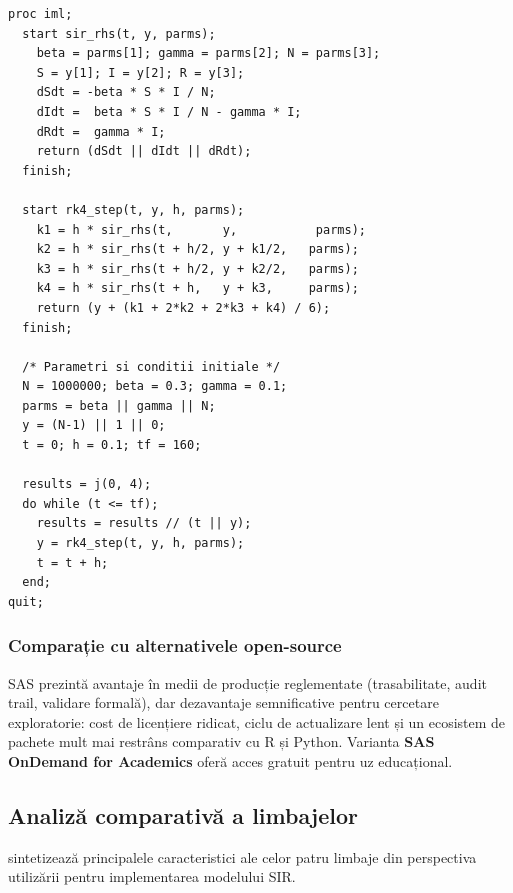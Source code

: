 \begin{lstlisting}[language=SAS, caption={Rezolvarea sistemului SIR în SAS/IML cu schema RK4}]
proc iml;
  start sir_rhs(t, y, parms);
    beta = parms[1]; gamma = parms[2]; N = parms[3];
    S = y[1]; I = y[2]; R = y[3];
    dSdt = -beta * S * I / N;
    dIdt =  beta * S * I / N - gamma * I;
    dRdt =  gamma * I;
    return (dSdt || dIdt || dRdt);
  finish;

  start rk4_step(t, y, h, parms);
    k1 = h * sir_rhs(t,       y,           parms);
    k2 = h * sir_rhs(t + h/2, y + k1/2,   parms);
    k3 = h * sir_rhs(t + h/2, y + k2/2,   parms);
    k4 = h * sir_rhs(t + h,   y + k3,     parms);
    return (y + (k1 + 2*k2 + 2*k3 + k4) / 6);
  finish;

  /* Parametri si conditii initiale */
  N = 1000000; beta = 0.3; gamma = 0.1;
  parms = beta || gamma || N;
  y = (N-1) || 1 || 0;
  t = 0; h = 0.1; tf = 160;

  results = j(0, 4);
  do while (t <= tf);
    results = results // (t || y);
    y = rk4_step(t, y, h, parms);
    t = t + h;
  end;
quit;
\end{lstlisting}

\subsubsection{Comparație cu alternativele open-source}

SAS prezintă avantaje în medii de producție reglementate (trasabilitate,
audit trail, validare formală), dar dezavantaje semnificative pentru cercetare
exploratorie: cost de licențiere ridicat, ciclu de actualizare lent și
un ecosistem de pachete mult mai restrâns comparativ cu R și Python.
Varianta \textbf{SAS OnDemand for Academics} oferă acces gratuit pentru
uz educațional.

\subsection{Analiză comparativă a limbajelor}
\label{subsec:comparatie_limbaje}

 sintetizează principalele caracteristici ale
celor patru limbaje din perspectiva utilizării pentru implementarea modelului SIR.

